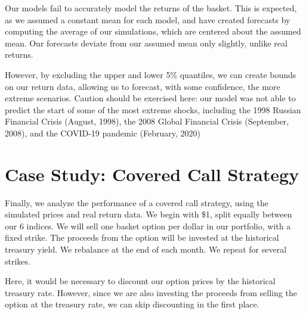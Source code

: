 \documentclass[11pt]{article}
\begin{document}
    Our models fail to accurately model the returns of the basket. This is
expected, as we assumed a constant mean for each model, and have created
forecasts by computing the average of our simulations, which are
centered about the assumed mean. Our forecasts deviate from our assumed
mean only slightly, unlike real returns.

However, by excluding the upper and lower 5\% quantiles, we can create
bounds on our return data, allowing us to forecast, with some
confidence, the more extreme scenarios. Caution should be exercised
here: our model was not able to predict the start of some of the most
extreme shocks, including the 1998 Russian Financial Crisis (August,
1998), the 2008 Global Financial Crisis (September, 2008), and the
COVID-19 pandemic (February, 2020)

    \section{Case Study: Covered Call
Strategy}\label{case-study-covered-call-strategy}

    Finally, we analyze the performance of a covered call strategy, using
the simulated prices and real return data. We begin with \$1, split
equally between our 6 indices. We will sell one basket option per dollar
in our portfolio, with a fixed strike. The proceeds from the option will
be invested at the historical treasury yield. We rebalance at the end of
each month. We repeat for several strikes.

Here, it would be necessary to discount our option prices by the
historical treasury rate. However, since we are also investing the
proceeds from selling the option at the treasury rate, we can skip
discounting in the first place.
\end{document}
